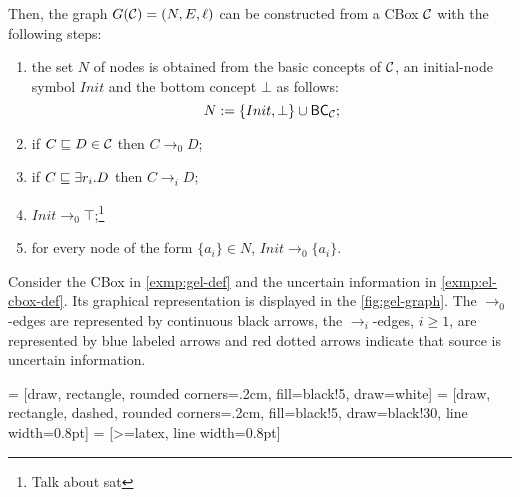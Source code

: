 Then, the graph $G(\mathcal{C}) = (N, E, \ell)$ can be constructed from a CBox $\mathcal{C}$ with the following steps:
\begin{enumerate}
	\item the set $N$ of nodes is obtained from the basic concepts of $\mathcal{C}$, an initial-node symbol $Init$ and the bottom concept $\bot$ %
	as follows:
		  \[ N := \{Init, \bot\} \cup \textsf{BC}_{\mathcal{C}} 
		  ; 
		  \]
	\item if $C \sqsubseteq D \in \mathcal{C}$ then $C \to_0 D$;
	\item if $C \sqsubseteq \exists r_i.D$ then $C \to_i D$;
	\item $Init \to_0 \top$;\footnote{Talk about sat}
	\item for every node of the form $\{a_i\} \in N$, $Init \to_0 \{a_i\}$.
\end{enumerate}

\begin{example}
	Consider the CBox in \autoref{exmp:gel-def} and the uncertain information in \autoref{exmp:el-cbox-def}. Its graphical representation is displayed in the \autoref{fig:gel-graph}. The $\to_0$-edges are represented by continuous black arrows, the $\to_i$-edges, $i \geq 1$, are represented by blue labeled arrows and red dotted arrows indicate that source is uncertain information.
\end{example}

 = [draw, rectangle, rounded corners=.2cm, fill=black!5, draw=white]
 = [draw, rectangle, dashed, rounded corners=.2cm, fill=black!5, draw=black!30, line width=0.8pt]
 = [>=latex, line width=0.8pt]

